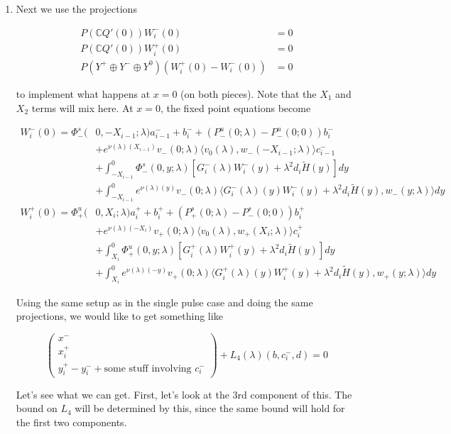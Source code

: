 \documentclass[12pt]{article}
\def\C{{\mathbb C}}
\begin{document}
\begin{enumerate}
\item Next we use the projections 

\begin{align*}
P(\C Q'(0))W_i^-(0) &= 0 \\
P(\C Q'(0))W_i^+(0) &= 0 \\
P(Y^+ \oplus Y^- \oplus Y^0) ( W_i^+(0) - W_i^-(0) ) &= 0
\end{align*}

to implement what happens at $x = 0$ (on both pieces). Note that the $X_1$ and $X_2$ terms will mix here. At $x = 0$, the fixed point equations become

\begin{align*}
W_i^-(0) = \Phi^s_-(&0, -X_{i-1}; \lambda)a_{i-1}^- + b_i^- + (P^u_-(0; \lambda) - P^u_-(0; 0))b_i^- \\
&+ e^{\nu(\lambda)(X_{i-1})} v_-(0; \lambda) \langle v_0(\lambda), w_-(-X_{i-1}; \lambda) \rangle c_{i-1}^- \\
&+ \int_{-X_{i-1}}^0 \Phi^s_-(0, y; \lambda) [ G_i^-(\lambda)W_i^-(y) + \lambda^2 d_i \tilde{H}(y) ] dy \\
&+ \int_{-X_{i-1}}^0
e^{\nu(\lambda)(y)} v_-(0; \lambda) \langle G_i^-(\lambda)(y)W_i^-(y) + \lambda^2 d_i \tilde{H}(y), w_-(y; \lambda) \rangle dy \\
W_i^+(0) = \Phi^u_+(&0, X_i; \lambda)a_i^+ + b_i^+ + (P^s_+(0; \lambda) - P^s_-(0; 0))b_i^+ \\
&+ e^{\nu(\lambda)(-X_i)} v_+(0; \lambda) \langle v_0(\lambda), w_+(X_i; \lambda) \rangle c_i^+ \\
&+ \int_{X_i}^0 \Phi^u_+(0, y; \lambda) [ G_i^+(\lambda)W_i^+(y) + \lambda^2 d_i \tilde{H}(y) ] dy \\
&+ \int_{X_i}^0 e^{\nu(\lambda)(-y)} v_+(0; \lambda) \langle G_i^+(\lambda)(y)W_i^+(y) + \lambda^2 d_i \tilde{H}(y), w_+(y; \lambda) \rangle dy
\end{align*}

Using the same setup as in the single pulse case and doing the same projections, we would like to get something like

\[
\begin{pmatrix}x^- \\ x_i^+ \\ y_i^+ - y_i^- + \text{some stuff involving $c_i^-$} \end{pmatrix}+ L_4(\lambda)(b, c_i^-,d) = 0
\]

Let's see what we can get. First, let's look at the 3rd component of this. The bound on $L_4$ will be determined by this, since the same bound will hold for the first two components.


\end{enumerate}
\end{document}
